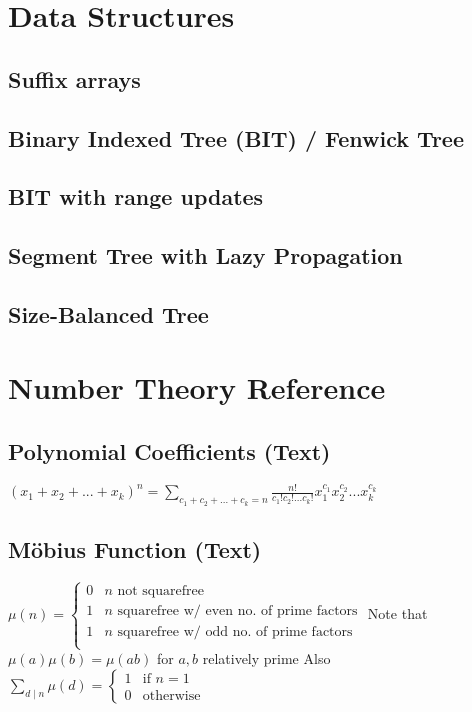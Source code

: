 \documentclass[9pt]{extarticle}
\begin{document}
\begin{multicols*}{3}
\section{Data Structures}

\subsection{Suffix arrays} %


\subsection{Binary Indexed Tree (BIT) / Fenwick Tree} %


\subsection{BIT with range updates} %


\subsection{Segment Tree with Lazy Propagation} %


\subsection{Size-Balanced Tree}


\section{Number Theory Reference}
\subsection{Polynomial Coefficients (Text)} %
$(x_1 + x_2 + ... + x_k)^n = \sum_{c_1 + c_2 + ... + c_k = n}
\frac{n!}{c_1! c_2! ... c_k!} x_1^{c_1} x_2^{c_2} ... x_k^{c_k}$

\subsection{M\"obius Function (Text)} %
$\mu(n) = \begin{cases}
0 & \text{$n$ not squarefree} \\
1 & \text{$n$ squarefree w/ even no. of prime factors} \\
1 & \text{$n$ squarefree w/ odd no. of prime factors} \\
\end{cases}$
Note that $\mu(a) \mu(b) = \mu(ab)$ for $a, b$ relatively prime
Also $\sum_{d \mid n} \mu(d) = \begin{cases} 1 & \text{if $n = 1$} \\
0 & \text{otherwise} \end{cases}$


\end{multicols*}
\end{document}
